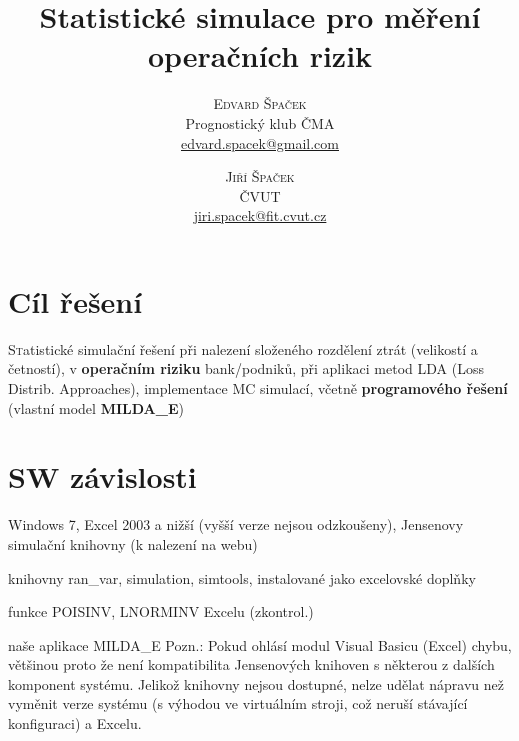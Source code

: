 \documentclass{article}
\title{\vspace{-15mm}\fontsize{24pt}{10pt}\selectfont\textbf{Statistické simulace pro měření operačních rizik}} %
\author{
\large
\textsc{Edvard Špaček} \\
\normalsize Prognostický klub ČMA \\ %
\normalsize \href{mailto:edvard.spacek@gmail.com}{edvard.spacek@gmail.com} %
\and
\large
\textsc{Jiří Špaček} \\
\normalsize ČVUT \\ %
\normalsize \href{mailto:jiri.spacek@fit.cvut.cz}{jiri.spacek@fit.cvut.cz} %
\and
\vspace{-5mm}
}
\date{}
\begin{document}
\maketitle %

\thispagestyle{fancy} %







\section{Cíl řešení}

\lettrine[nindent=0em,lines=3]{S} tatistické simulační řešení při nalezení složeného rozdělení ztrát (velikostí a četností), v \textbf{operačním riziku} bank/podniků, při aplikaci metod LDA (Loss Distrib. Approaches), implementace MC simulací, včetně \textbf{programového řešení} (vlastní model \textbf{MILDA\_E})




\section{SW závislosti}

\begin{compactitem}
\item Windows 7, Excel 2003 a nižší (vyšší verze nejsou odzkoušeny), Jensenovy simulační knihovny (k nalezení na webu)
\item knihovny ran\_var, simulation, simtools, instalované jako excelovské doplňky
\item funkce POISINV, LNORMINV Excelu (zkontrol.)
\item naše aplikace MILDA\_E
Pozn.: Pokud ohlásí modul Visual Basicu (Excel) chybu, většinou proto že není kompatibilita Jensenových knihoven s některou z dalších komponent systému. Jelikož knihovny nejsou dostupné, nelze udělat nápravu než vyměnit verze systému (s výhodou ve virtuálním stroji, což neruší stávající konfiguraci) a Excelu.
\end{compactitem}
\end{document}
